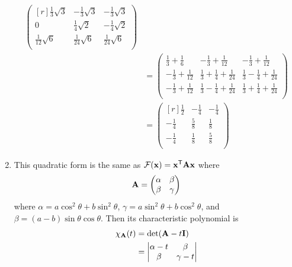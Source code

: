 \documentclass[fleqn,a4paper,11pt]{article}
\begin{document}
\begin{enumerate}[label=\textbf{\arabic*.}]
\begin{align*}
\begin{pmatrix*}[r]
     \frac 13 \sqrt 3  & -\frac 13 \sqrt 3 & -\frac 13 \sqrt 3 \\[0.5ex]
     0 & \frac 14 \sqrt 2 & -\frac 14 \sqrt 2 \\[0.5ex]
     \frac 1{12} \sqrt 6 & \frac 1{24} \sqrt 6 & \frac 1{24} \sqrt 6 \\[0.5ex]
    \end{pmatrix*} \\
    &=
    \begin{pmatrix}
     \frac 13 + \frac 16
      & -\frac 13 + \frac 1{12}
      & -\frac 13 + \frac 1{12} \\[0.5ex]
     -\frac 13 + \frac 1{12}
      & \frac 13 + \frac 14 + \frac 1{24}
      & \frac 13 - \frac 14 + \frac 1{24} \\[0.5ex]
     -\frac 13 + \frac 1{12}
      & \frac 13 - \frac 14 + \frac 1{24}
      & \frac 13 + \frac 14 + \frac 1{24} \\[0.5ex]
    \end{pmatrix} \\
    &=
    \begin{pmatrix*}[r]
     \frac 12 & -\frac 14 & -\frac 14 \\[0.5ex]
     -\frac 14 & \frac 58 & \frac 18 \\[0.5ex]
     -\frac 14 & \frac 18 & \frac 58 \\[0.5ex]
    \end{pmatrix*}
   \end{align*}
  \item
   This quadratic form is the same as
   \(\mathcal F(\mathrm{\mathbf{x}}) = \mathrm{\mathbf{x}}^{\mathsf T} \mathbf{A} \mathrm{\mathbf{x}}\)
   where
   \begin{equation*}
    \mathbf{A} =
    \begin{pmatrix}
     \alpha & \beta \\
     \beta & \gamma
    \end{pmatrix}
   \end{equation*}
   where \(\alpha = a\cos^2 \theta + b\sin^2 \theta\),
   \(\gamma = a\sin^2 \theta + b\cos^2 \theta\), and
   \(\beta = (a - b)\sin \theta \cos \theta\).
   Then its characteristic polynomial is
   \begin{align*}
    \chi_{\mat A}(t)
    &= \det(\mat A - t\mat I) \\
    &=
    \begin{vmatrix}
     \alpha - t & \beta \\
     \beta & \gamma - t
    \end{vmatrix} \\

\end{align*}
\end{enumerate}
\end{document}
